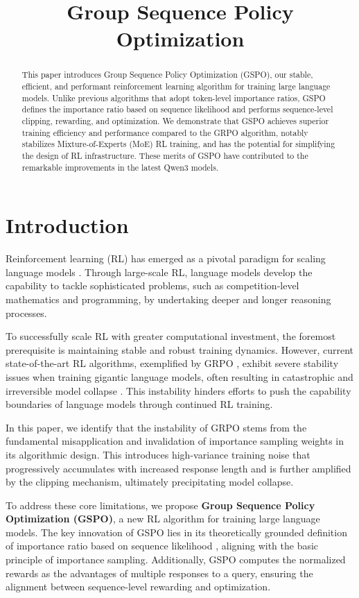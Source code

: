 \title{Group Sequence Policy Optimization}

\begin{abstract}
This paper introduces Group Sequence Policy Optimization (GSPO), our stable, efficient, and performant reinforcement learning algorithm for training large language models. Unlike previous algorithms that adopt token-level importance ratios, GSPO defines the importance ratio based on sequence likelihood and performs sequence-level clipping, rewarding, and optimization. We demonstrate that GSPO achieves superior training efficiency and performance compared to the GRPO algorithm, notably stabilizes Mixture-of-Experts (MoE) RL training, and has the potential for simplifying the design of RL infrastructure. These merits of GSPO have contributed to the remarkable improvements in the latest Qwen3 models.
\end{abstract}

\section{Introduction}
\label{sec:intro}

Reinforcement learning (RL) has emerged as a pivotal paradigm for scaling language models \citep{o1,dpsk-r1,qwq32b,qwen3}. Through large-scale RL, language models develop the capability to tackle sophisticated problems, such as competition-level mathematics and programming, by undertaking deeper and longer reasoning processes.

To successfully scale RL with greater computational investment, the foremost prerequisite is maintaining stable and robust training dynamics. However, current state-of-the-art RL algorithms, exemplified by GRPO \citep{grpo}, exhibit severe stability issues when training gigantic language models, often resulting in catastrophic and irreversible model collapse \citep{qwen3, minimax-m1}. This instability hinders efforts to push the capability boundaries of language models through continued RL training.

In this paper, we identify that the instability of GRPO stems from the fundamental misapplication and invalidation of importance sampling weights in its algorithmic design. This introduces high-variance training noise that progressively accumulates with increased response length and is further amplified by the clipping mechanism, ultimately precipitating model collapse.

To address these core limitations, we propose \textbf{Group Sequence Policy Optimization (GSPO)}, a new RL algorithm for training large language models. The key innovation of GSPO lies in its theoretically grounded definition of importance ratio based on sequence likelihood \citep{click}, aligning with the basic principle of importance sampling. Additionally, GSPO computes the normalized rewards as the advantages of multiple responses to a query, ensuring the alignment between sequence-level rewarding and optimization.

